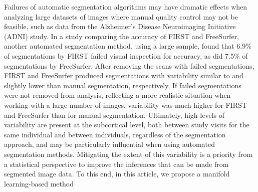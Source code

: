 \documentclass[12pt]{article}
\theoremstyle{definition}
\begin{document}
Failures of automatic segmentation algorithms may have dramatic effects when analyzing large datasets of images where manual quality control may not be feasible, such as data from the Alzheimer's Disease Neuroimaging Initiative (ADNI) study. In a study comparing the accuracy of FIRST and FreeSurfer, another automated segmentation method, using a large sample, \cite{mulder2014Hippocampal} found that 6.9\% of segmentations by FIRST failed visual inspection for accuracy, as did 7.5\% of segmentations by FreeSurfer. After removing the scans with failed segmentations, FIRST and FreeSurfer produced segmentations with variability similar to and slightly lower than manual segmentation, respectively. If failed segmentations were not removed from analysis, reflecting a more realistic situation when working with a large number of images, variability was much higher for FIRST and FreeSurfer than for manual segmentation.  Ultimately, high levels of variability are present at the subcortical level, both between study visits for the same individual and between individuals, regardless of the segmentation approach, and may be particularly influential when using automated segmentation methods. Mitigating the extent of this variability is a priority from a statistical perspective to improve the inferences that can be made from segmented image data. To this end, in this article, we propose a manifold learning-based method 
\end{document}

